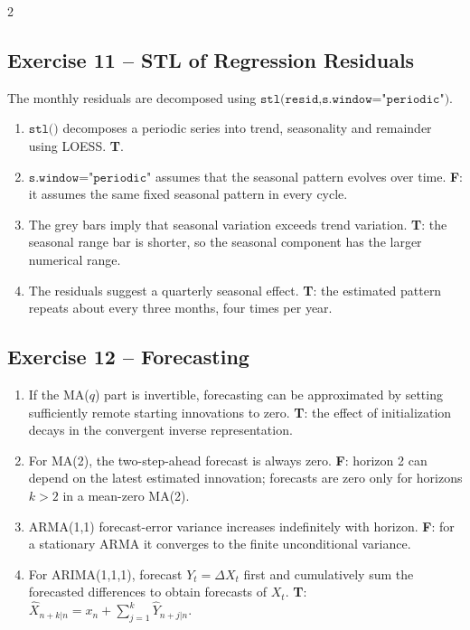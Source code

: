 \documentclass[9pt,a4paper]{extarticle}
\begin{document}
\begin{multicols}{2}
\subsection*{Exercise 11 -- STL of Regression Residuals}
The monthly residuals are decomposed using \(\texttt{stl(resid,s.window="periodic")}\).
\begin{enumerate}[label=\alph*),leftmargin=4mm]
\item \(\texttt{stl()}\) decomposes a periodic series into trend, seasonality and remainder using LOESS. \textbf{T}.
\item \(\texttt{s.window="periodic"}\) assumes that the seasonal pattern evolves over time. \textbf{F}: it assumes the same fixed seasonal pattern in every cycle.
\item The grey bars imply that seasonal variation exceeds trend variation. \textbf{T}: the seasonal range bar is shorter, so the seasonal component has the larger numerical range.
\item The residuals suggest a quarterly seasonal effect. \textbf{T}: the estimated pattern repeats about every three months, four times per year.
\end{enumerate}

\subsection*{Exercise 12 -- Forecasting}
\begin{enumerate}[label=\alph*),leftmargin=4mm]
\item If the MA(\(q\)) part is invertible, forecasting can be approximated by setting sufficiently remote starting innovations to zero. \textbf{T}: the effect of initialization decays in the convergent inverse representation.
\item For MA(2), the two-step-ahead forecast is always zero. \textbf{F}: horizon 2 can depend on the latest estimated innovation; forecasts are zero only for horizons \(k>2\) in a mean-zero MA(2).
\item ARMA(1,1) forecast-error variance increases indefinitely with horizon. \textbf{F}: for a stationary ARMA it converges to the finite unconditional variance.
\item For ARIMA(1,1,1), forecast \(Y_t=\Delta X_t\) first and cumulatively sum the forecasted differences to obtain forecasts of \(X_t\). \textbf{T}: \(\widehat X_{n+k|n}=x_n+\sum_{j=1}^k\widehat Y_{n+j|n}\).
\end{enumerate}


\end{multicols}
\end{document}
